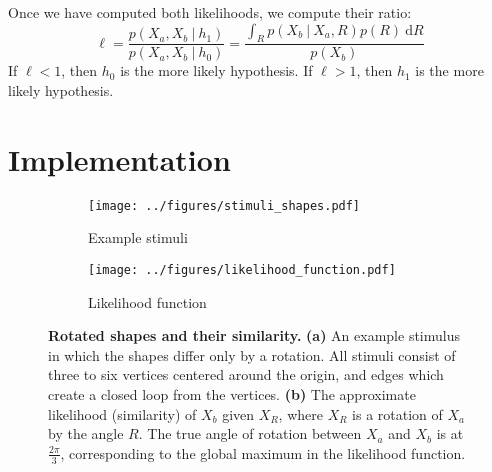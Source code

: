 \documentclass{article} %
\begin{document}
Once we have computed both likelihoods, we compute their ratio:
\begin{equation}
  \ell=\frac{p(X_a, X_b\ \vert \ h_1)}{p(X_a, X_b\ \vert \ h_0)}=\frac{\int_R p(X_b\ \vert\ X_a, R)p(R)\ \mathrm{d}R}{p(X_b)}
  \label{eq:lh-ratio}
\end{equation}
If $\ell<1$, then $h_0$ is the more likely hypothesis. If $\ell>1$,
then $h_1$ is the more likely hypothesis.

\section{Implementation}


\begin{figure}[t]
  \centering
  \begin{subfigure}[b]{0.45\textwidth}
    \centering
    \texttt{[image: ../figures/stimuli\_shapes.pdf]}
    \vspace{0pt}
    \caption{Example stimuli}
    \label{fig:stimuli}
  \end{subfigure}
  \begin{subfigure}[b]{0.45\textwidth}
    \centering
    \texttt{[image: ../figures/likelihood\_function.pdf]}
    \caption{Likelihood function}
    \label{fig:likelihood}
  \end{subfigure}
  \caption{\textbf{Rotated shapes and their similarity.}  \textbf{(a)}
    An example stimulus in which the shapes differ only by a
    rotation. All stimuli consist of three to six vertices centered
    around the origin, and edges which create a closed loop from the
    vertices. \textbf{(b)} The approximate likelihood (similarity) of
    $X_b$ given $X_R$, where $X_R$ is a rotation of $X_a$ by the angle
    $R$. The true angle of rotation between $X_a$ and $X_b$ is at
    $\frac{2\pi}{3}$, corresponding to the global maximum in the
    likelihood function.}
  \label{fig:shapes}
\end{figure}
\end{document}
